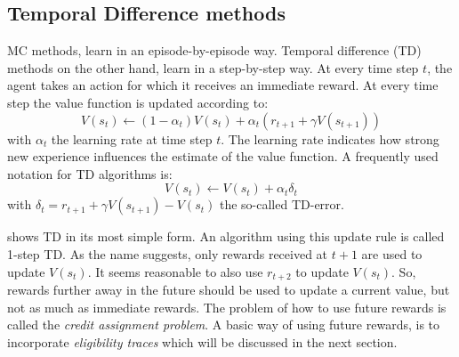 \documentclass[a4paper,11pt]{mscLiterature}
\begin{document}
		\subsection{Temporal Difference methods}\label{sec:TDmethods}
		MC methods, learn in an episode-by-episode way. Temporal difference (TD) methods on the other hand, learn in a step-by-step way. At every time step $t$, the agent takes an action for which it receives an immediate reward. At every time step the value function is updated according to:
		\begin{equation}
				V(s_t) \leftarrow (1-\alpha_t)V(s_t) + \alpha_t \left( r_{t+1} + \gamma V(s_{t+1}) \right)
		\end{equation}
		with $\alpha_t$ the learning rate at time step $t$. The learning rate indicates how strong new experience influences the estimate of the value function. A frequently used notation for TD algorithms is:
		\begin{equation}\label{eqn:TDbasic}
				V(s_t) \leftarrow V(s_t) + \alpha_t \delta_t
		\end{equation}
		with $\delta_t =  r_{t+1} + \gamma V(s_{t+1}) - V(s_t)$ the so-called TD-error. 
		
		 shows TD in its most simple form. An algorithm using this update rule is called 1-step TD. As the name suggests, only rewards received at $t+1$ are used to update $V(s_t)$. It seems reasonable to also use $r_{t+2}$ to update $V(s_t)$. So, rewards further away in the future should be used to update a current value, but not as much as immediate rewards. The problem of how to use future rewards is called the \emph{credit assignment problem}. A basic way of using future rewards, is to incorporate \emph{eligibility traces} which will be discussed in the next section.
		
\end{document}
